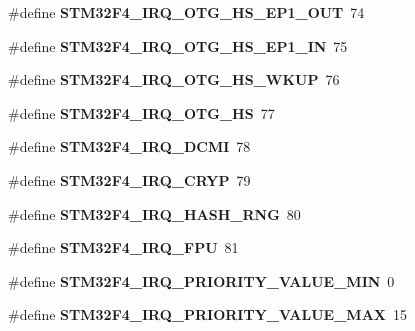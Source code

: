 \begin{DoxyCompactItemize}
\#define {\bfseries S\+T\+M32\+F4\+\_\+\+I\+R\+Q\+\_\+\+O\+T\+G\+\_\+\+H\+S\+\_\+\+E\+P1\+\_\+\+O\+UT}~74
\item 
\mbox{\label{group__stm32f4__interrupt_ga7812e74d957a095ce1c9d5181618a687}} 
\#define {\bfseries S\+T\+M32\+F4\+\_\+\+I\+R\+Q\+\_\+\+O\+T\+G\+\_\+\+H\+S\+\_\+\+E\+P1\+\_\+\+IN}~75
\item 
\mbox{\label{group__stm32f4__interrupt_gadf901cd7fb8ceea6db79e3670b6ba96b}} 
\#define {\bfseries S\+T\+M32\+F4\+\_\+\+I\+R\+Q\+\_\+\+O\+T\+G\+\_\+\+H\+S\+\_\+\+W\+K\+UP}~76
\item 
\mbox{\label{group__stm32f4__interrupt_gab3b5909ed19e61d7bbd0a6e5144e6a23}} 
\#define {\bfseries S\+T\+M32\+F4\+\_\+\+I\+R\+Q\+\_\+\+O\+T\+G\+\_\+\+HS}~77
\item 
\mbox{\label{group__stm32f4__interrupt_ga10a7cc940396d73f2425be4baabe61da}} 
\#define {\bfseries S\+T\+M32\+F4\+\_\+\+I\+R\+Q\+\_\+\+D\+C\+MI}~78
\item 
\mbox{\label{group__stm32f4__interrupt_ga58cea5a653fa19348d033688b09f5718}} 
\#define {\bfseries S\+T\+M32\+F4\+\_\+\+I\+R\+Q\+\_\+\+C\+R\+YP}~79
\item 
\mbox{\label{group__stm32f4__interrupt_ga26ffc47c2b94e6d1a0cce9d3fbd0e06e}} 
\#define {\bfseries S\+T\+M32\+F4\+\_\+\+I\+R\+Q\+\_\+\+H\+A\+S\+H\+\_\+\+R\+NG}~80
\item 
\mbox{\label{group__stm32f4__interrupt_ga485c37bf5606f739513a46cbde346be3}} 
\#define {\bfseries S\+T\+M32\+F4\+\_\+\+I\+R\+Q\+\_\+\+F\+PU}~81
\item 
\mbox{\label{group__stm32f4__interrupt_gaaae050347d639e39f4abfc72f14a3ee6}} 
\#define {\bfseries S\+T\+M32\+F4\+\_\+\+I\+R\+Q\+\_\+\+P\+R\+I\+O\+R\+I\+T\+Y\+\_\+\+V\+A\+L\+U\+E\+\_\+\+M\+IN}~0
\item 
\mbox{\label{group__stm32f4__interrupt_ga90754365fd8ceadb71f5b24824624dc6}} 
\#define {\bfseries S\+T\+M32\+F4\+\_\+\+I\+R\+Q\+\_\+\+P\+R\+I\+O\+R\+I\+T\+Y\+\_\+\+V\+A\+L\+U\+E\+\_\+\+M\+AX}~15

\end{DoxyCompactItemize}

